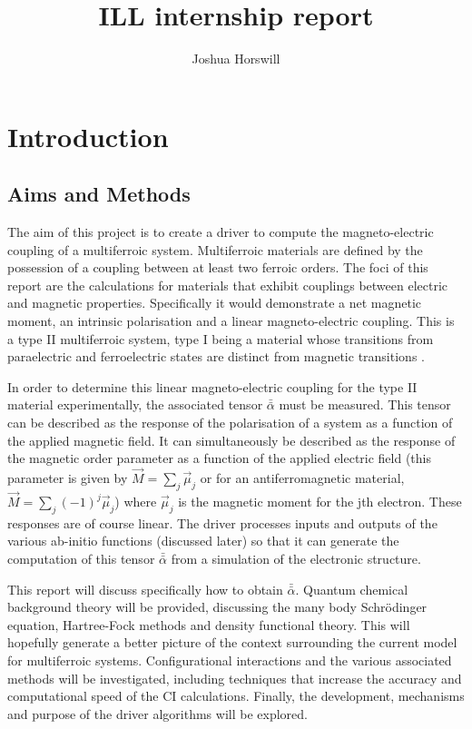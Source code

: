 \documentclass[10pt]{article}
\author{Joshua Horswill}
\title{ILL internship report}
\begin{document}
\maketitle
\tableofcontents
\section{Introduction}
\subsection{Aims and Methods}
The aim of this project is to create a driver to compute the magneto-electric coupling of a multiferroic system. Multiferroic materials are defined by the possession of a coupling between at least two ferroic orders. The foci of this report are the calculations for materials that exhibit couplings between electric and magnetic properties. Specifically it would demonstrate a net magnetic moment, an intrinsic polarisation and a linear magneto-electric coupling. This is a type II multiferroic system, type I being a material whose transitions from paraelectric and ferroelectric states are distinct from magnetic transitions \cite{Hur2004}\cite{goto2004ferroelectricity}.

In order to determine this linear magneto-electric coupling for the type II material experimentally, the associated tensor $\bar{\bar{\alpha}}$ must be measured. This tensor can be described as the response of the polarisation of a system as a function of the applied magnetic field. It can simultaneously be described as the response of the magnetic order parameter as a function of the applied electric field (this parameter is given by $\vec{M} = \sum_j \vec{\mu}_j$ or for an antiferromagnetic material, $\vec{M} = \sum_j (-1)^j \vec{\mu}_j$) where $\vec{\mu}_j$ is the magnetic moment for the jth electron. These responses are of course linear. The driver processes inputs and outputs of the various ab-initio functions (discussed later) so that it can generate the computation of this tensor $\bar{\bar{\alpha}}$ from a simulation of the electronic structure.

This report will discuss specifically how to obtain $\bar{\bar{\alpha}}$. Quantum chemical background theory will be provided, discussing the many body Schrödinger equation, Hartree-Fock methods and density functional theory. This will hopefully generate a better picture of the context surrounding the current model for multiferroic systems. Configurational interactions and the various associated methods will be investigated, including techniques that increase the accuracy and computational speed of the CI calculations. Finally, the development, mechanisms and purpose of the driver algorithms will be explored.
\end{document}
